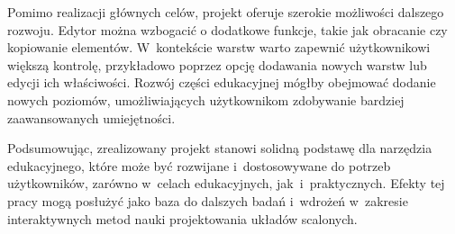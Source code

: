 Pomimo realizacji głównych celów,
projekt oferuje szerokie możliwości dalszego rozwoju.
Edytor można wzbogacić o dodatkowe funkcje,
takie jak obracanie czy kopiowanie elementów.
W~kontekście warstw warto zapewnić użytkownikowi większą kontrolę,
przykładowo poprzez opcję dodawania nowych warstw lub edycji ich właściwości.
Rozwój części edukacyjnej mógłby obejmować dodanie nowych poziomów,
umożliwiających użytkownikom zdobywanie bardziej zaawansowanych umiejętności.


Podsumowując, zrealizowany projekt stanowi solidną podstawę dla narzędzia edukacyjnego,
które może być rozwijane i~dostosowywane do potrzeb użytkowników, zarówno w~celach edukacyjnych,
jak~i~praktycznych.
Efekty tej pracy mogą posłużyć jako baza do dalszych badań
i~wdrożeń w~zakresie interaktywnych metod nauki projektowania układów scalonych.

